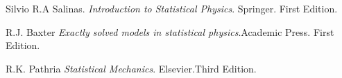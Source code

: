 \documentclass[a4paper]{article}
\begin{document}
\begin{thebibliography}{99}

Silvio R.A Salinas. \textit{Introduction to Statistical Physics}. Springer. First Edition.

R.J. Baxter \textit{Exactly solved models in statistical physics}.Academic Press. First Edition. 

R.K. Pathria \textit{Statistical Mechanics}. Elsevier.Third Edition.






\end{thebibliography}
\end{document}
